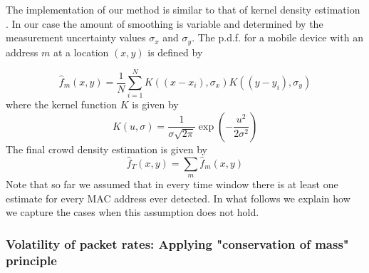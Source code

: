 \documentclass[10pt,a4paper]{article}
\begin{document}
The implementation of our method is similar to that of kernel density estimation \cite{scott}\cite{silverman}.
In our case the amount of smoothing is variable and determined by the measurement uncertainty values $\sigma_{x}$ and $\sigma_{y}$.
The p.d.f.  for a mobile device with an address  $m$ at a location $(x,y)$ is defined by

\begin{equation}
\hat{f}_{m}(x,y)=\frac{1}{N}\sum_{i=1}^{N}K((x-x_{i}),\sigma_{x}) K((y-y_{i}),\sigma_{y})
\label{kde}
\end{equation}
where the kernel function $K$ is given by
\begin{equation}
K(u,\sigma)=\frac{1}{\sigma\sqrt{2\pi}}\exp(-\frac{u^2}{2\sigma^2})
\end{equation}
The final crowd density estimation is given by
\begin{equation}
\hat{f}_{T}(x,y)=\sum_{m}\hat{f}_{m}(x,y)
\label{total}
\end{equation}
Note that so far we assumed that in every time window there is at least one estimate for every MAC address ever detected. In what follows we explain how we capture the cases when this assumption does not hold. 

\subsubsection{Volatility of packet rates: Applying "conservation of mass" principle }
\end{document}
